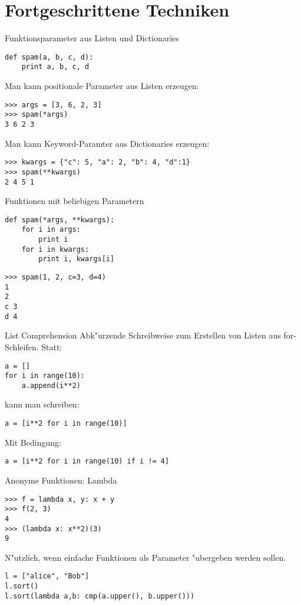 \section{Fortgeschrittene Techniken}

\begin{frame}[fragile]{Funktionsparameter aus Listen und Dictionaries}
\begin{lstlisting}
def spam(a, b, c, d):
    print a, b, c, d
\end{lstlisting}
Man kann positionale Parameter aus Listen erzeugen:
\begin{lstlisting}[style=Shell]
>>> args = [3, 6, 2, 3]
>>> spam(*args)
3 6 2 3
\end{lstlisting}
Man kann Keyword-Paramter aus Dictionaries erzeugen:
\begin{lstlisting}[style=Shell]
>>> kwargs = {"c": 5, "a": 2, "b": 4, "d":1}
>>> spam(**kwargs)
2 4 5 1
\end{lstlisting}
\end{frame}

\begin{frame}[fragile]{Funktionen mit beliebigen Parametern}
\begin{lstlisting}
def spam(*args, **kwargs):
    for i in args:
        print i
    for i in kwargs:
        print i, kwargs[i]
\end{lstlisting}
\begin{lstlisting}[style=Shell]
>>> spam(1, 2, c=3, d=4)
1
2
c 3
d 4
\end{lstlisting}
\end{frame}


\begin{frame}[fragile]{List Comprehension}
Abk"urzende Schreibweise zum Erstellen von Listen aus for-Schleifen. Statt:
\begin{lstlisting}
a = []
for i in range(10):
    a.append(i**2)
\end{lstlisting}
kann man schreiben:
\begin{lstlisting}
a = [i**2 for i in range(10)]
\end{lstlisting}
\vspace{2mm}
Mit Bedingung:
\begin{lstlisting}
a = [i**2 for i in range(10) if i != 4]
\end{lstlisting}
\end{frame}

\begin{frame}[fragile]{Anonyme Funktionen: Lambda}
\begin{lstlisting}[style=Shell]
>>> f = lambda x, y: x + y
>>> f(2, 3)
4
>>> (lambda x: x**2)(3)
9
\end{lstlisting}
N"utzlich, wenn einfache Funktionen als Parameter "ubergeben werden sollen.
\begin{lstlisting}[style=Python]
l = ["alice", "Bob"]
l.sort()
l.sort(lambda a,b: cmp(a.upper(), b.upper()))
\end{lstlisting}

\end{frame}

